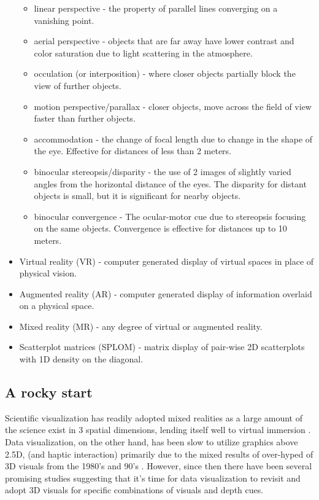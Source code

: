 \documentclass{monashthesis}
\begin{document}
\begin{itemize}
  \begin{itemize}
  \tightlist
  \item
    linear perspective - the property of parallel lines converging on a
    vanishing point.
  \item
    aerial perspective - objects that are far away have lower contrast
    and color saturation due to light scattering in the atmosphere.
  \item
    occulation (or interposition) - where closer objects partially block
    the view of further objects.
  \item
    motion perspective/parallax - closer objects, move across the field
    of view faster than further objects.
  \item
    accommodation - the change of focal length due to change in the
    shape of the eye. Effective for distances of less than 2 meters.
  \item
    binocular stereopsis/disparity - the use of 2 images of slightly
    varied angles from the horizontal distance of the eyes. The
    disparity for distant objects is small, but it is significant for
    nearby objects.
  \item
    binocular convergence - The ocular-motor cue due to stereopsis
    focusing on the same objects. Convergence is effective for distances
    up to 10 meters.
  \end{itemize}
\item
  Virtual reality (VR) - computer generated display of virtual spaces in
  place of physical vision.
\item
  Augmented reality (AR) - computer generated display of information
  overlaid on a physical space.
\item
  Mixed reality (MR) - any degree of virtual or augmented reality.
\item
  Scatterplot matrices (SPLOM) - matrix display of pair-wise 2D
  scatterplots with 1D density on the diagonal.
\end{itemize}

\subsection{A rocky start}\label{a-rocky-start}

Scientific visualization has readily adopted mixed realities as a large
amount of the science exist in 3 spatial dimensions, lending itself well
to virtual immersion \autocite{marriott_immersive_2018}. Data
visualization, on the other hand, has been slow to utilize graphics
above 2.5D, (and haptic interaction) primarily due to the mixed results
of over-hyped of 3D visuals from the 1980's and 90's
\autocite{munzner_visualization_2014}. However, since then there have
been several promising studies suggesting that it's time for data
visualization to revisit and adopt 3D visuals for specific combinations
of visuals and depth cues.
\end{document}
